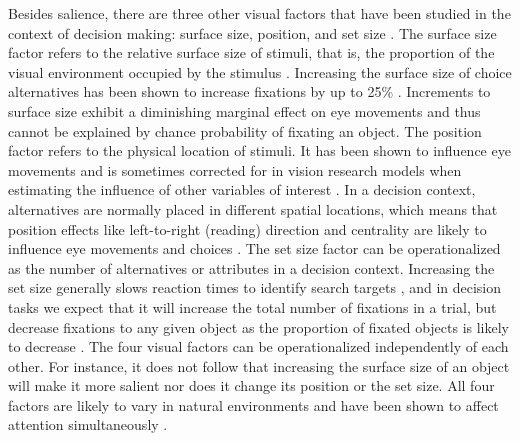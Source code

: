 Besides salience, there are three other visual factors that have been studied in the context of decision making: surface size, position, and set size \citep{orquin2013a, wedel2008}. The surface size factor refers to the relative surface size of stimuli, that is, the proportion of the visual environment occupied by the stimulus \citep[for a review see][]{peschel2013a}. Increasing the surface size of choice alternatives has been shown to increase fixations by up to 25\% \citep{chandon2009a}. Increments to surface size exhibit a diminishing marginal effect on eye movements \citep{lohse1997a} and thus cannot be explained by chance probability of fixating an object. The position factor refers to the physical location of stimuli. It has been shown to influence eye movements and is sometimes corrected for in vision research models when estimating the influence of other variables of interest \citep{clarke2014a}. In a decision context, alternatives are normally placed in different spatial locations, which means that position effects like left-to-right (reading) direction and centrality are likely to influence eye movements and choices \citep{atalay2012a, meissner2016a}. The set size factor can be operationalized as the number of alternatives or attributes in a decision context. Increasing the set size generally slows reaction times to identify search targets \citep{wolfe2010}, and in decision tasks we expect that it will increase the total number of fixations in a trial, but decrease fixations to any given object as the proportion of fixated objects is likely to decrease \citep{spinks2016a}. The four visual factors can be operationalized independently of each other. For instance, it does not follow that increasing the surface size of an object will make it more salient nor does it change its position or the set size. All four factors are likely to vary in natural environments and have been shown to affect attention simultaneously \citep{gidloef2017a, orquin2019a}.


